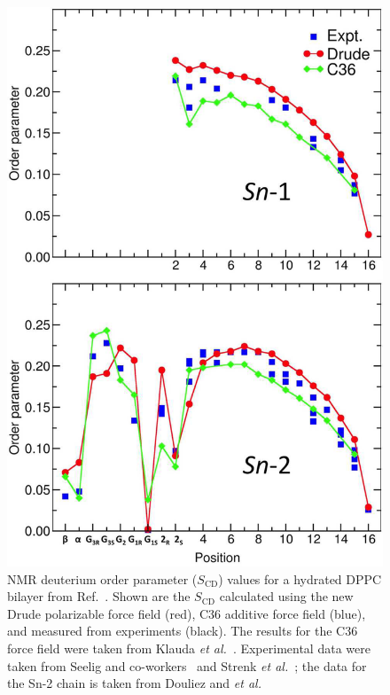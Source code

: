 \documentclass[journal=jpcbfk,manuscript=article,layout=twocolumn]{achemso}
\begin{document}
\begin{figure}[!hbt]
  \centering
  \includegraphics[width=\columnwidth]{../Figures/dppc_order_parameters_drude.png}
  \caption{NMR deuterium order parameter ($S_\mathrm{CD}$) values for a
  	hydrated DPPC bilayer from Ref.~. Shown are the $S_\mathrm{CD}$ calculated using the new
  	Drude polarizable force field (red), C36 additive force field (blue), and
  	measured from experiments (black). The results for the C36 force field
  	were taken from Klauda \textit{et al.}~\cite{klauda2010update}. Experimental data were taken from Seelig and co-workers~\cite{seelig1974dynamic,seelig1975bilayers,gally1975conformation,gally1981structure} and Strenk \textit{et al.}~\cite{strenk1985model}; the data for the Sn-2 chain is taken from Douliez and \textit{et al.}~\cite{douliez1995restatement}}
  \label{fig:drudedppc}
\end{figure}
\end{document}
